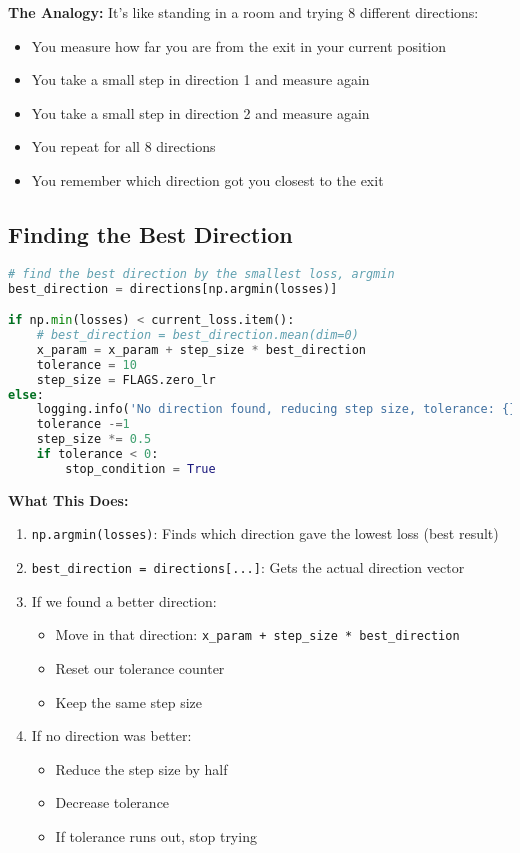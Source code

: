 \documentclass[12pt]{article}
\begin{document}
\textbf{The Analogy:}
It's like standing in a room and trying 8 different directions:
\begin{itemize}
    \item You measure how far you are from the exit in your current position
    \item You take a small step in direction 1 and measure again
    \item You take a small step in direction 2 and measure again
    \item You repeat for all 8 directions
    \item You remember which direction got you closest to the exit
\end{itemize}

\subsection{Finding the Best Direction}

\begin{lstlisting}[language=Python, basicstyle=\small]
# find the best direction by the smallest loss, argmin
best_direction = directions[np.argmin(losses)]

if np.min(losses) < current_loss.item():
    # best_direction = best_direction.mean(dim=0)
    x_param = x_param + step_size * best_direction
    tolerance = 10
    step_size = FLAGS.zero_lr
else:  
    logging.info('No direction found, reducing step size, tolerance: {}, {}'.format(step_size,tolerance))
    tolerance -=1
    step_size *= 0.5
    if tolerance < 0:
        stop_condition = True
\end{lstlisting}

\textbf{What This Does:}
\begin{enumerate}
    \item \texttt{np.argmin(losses)}: Finds which direction gave the lowest loss (best result)
    \item \texttt{best\_direction = directions[...]}: Gets the actual direction vector
    \item If we found a better direction:
    \begin{itemize}
        \item Move in that direction: \texttt{x\_param + step\_size * best\_direction}
        \item Reset our tolerance counter
        \item Keep the same step size
    \end{itemize}
    \item If no direction was better:
    \begin{itemize}
        \item Reduce the step size by half
        \item Decrease tolerance
        \item If tolerance runs out, stop trying
    \end{itemize}
\end{enumerate}
\end{document}
